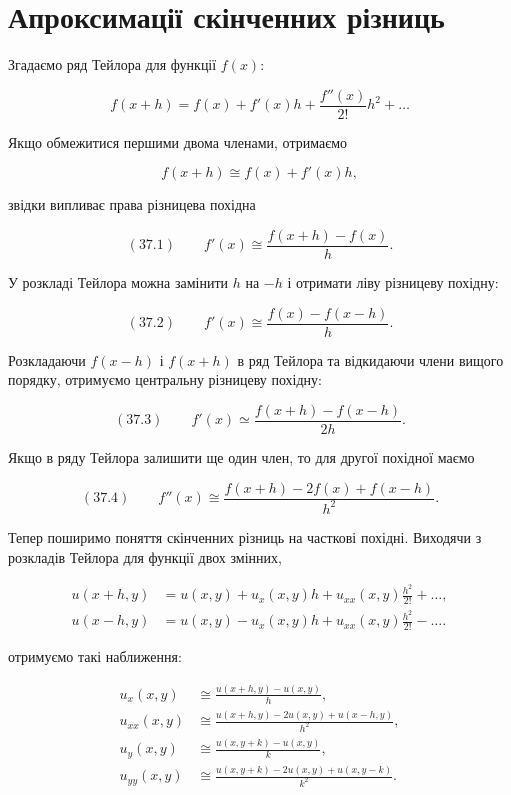 \documentclass[
  ukrainian,
]{article}
\begin{document}
\section{Апроксимації скінченних
різниць}\label{ux430ux43fux440ux43eux43aux441ux438ux43cux430ux446ux456ux457-ux441ux43aux456ux43dux447ux435ux43dux43dux438ux445-ux440ux456ux437ux43dux438ux446ux44c}

Згадаємо ряд Тейлора для функції \(f(x)\):

\[f(x+h)=f(x)+f'(x)h+\frac{f''(x)}{2!}h^2+\dots\]

Якщо обмежитися першими двома членами, отримаємо

\[f(x+h)\cong f(x)+f'(x)h,\]

звідки випливає права різницева похідна

\[(37.1)\qquad f'(x)\cong \frac{f(x+h)-f(x)}{h}.\]

У розкладі Тейлора можна замінити \(h\) на \(-h\) і отримати ліву
різницеву похідну:

\[(37.2)\qquad f'(x)\cong \frac{f(x)-f(x-h)}{h}.\]

Розкладаючи \(f(x-h)\) і \(f(x+h)\) в ряд Тейлора та відкидаючи члени
вищого порядку, отримуємо центральну різницеву похідну:

\[(37.3)\qquad f'(x)\simeq \frac{f(x+h)-f(x-h)}{2h}.\]

Якщо в ряду Тейлора залишити ще один член, то для другої похідної маємо

\[(37.4)\qquad f''(x)\cong \frac{f(x+h)-2f(x)+f(x-h)}{h^2}.\]

Тепер поширимо поняття скінченних різниць на часткові похідні. Виходячи
з розкладів Тейлора для функції двох змінних,

\[\begin{aligned}u(x+h,y)&=u(x,y)+u_x(x,y)h+u_{xx}(x,y)\frac{h^2}{2!}+\dots,\\u(x-h,y)&=u(x,y)-u_x(x,y)h+u_{xx}(x,y)\frac{h^2}{2!}-\dots.\end{aligned}\]

отримуємо такі наближення:

\[\begin{aligned}u_x(x,y) &\cong \frac{u(x+h,y)-u(x,y)}{h},\\u_{xx}(x,y) &\cong \frac{u(x+h,y)-2u(x,y)+u(x-h,y)}{h^2},\\u_y(x,y) &\cong \frac{u(x,y+k)-u(x,y)}{k},\\u_{yy}(x,y) &\cong \frac{u(x,y+k)-2u(x,y)+u(x,y-k)}{k^2}.\end{aligned}\]
\end{document}
